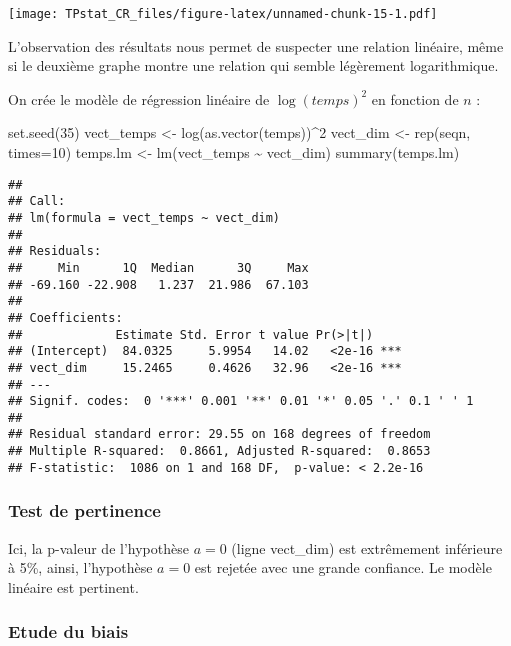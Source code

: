 \documentclass[
]{article}
\newenvironment{Shaded}{\begin{snugshade}}{\end{snugshade}}
\newcommand{\AttributeTok}[1]{\textcolor[rgb]{0.77,0.63,0.00}{#1}}
\newcommand{\DecValTok}[1]{\textcolor[rgb]{0.00,0.00,0.81}{#1}}
\newcommand{\FunctionTok}[1]{\textcolor[rgb]{0.00,0.00,0.00}{#1}}
\newcommand{\NormalTok}[1]{#1}
\newcommand{\OtherTok}[1]{\textcolor[rgb]{0.56,0.35,0.01}{#1}}
\newcommand{\SpecialCharTok}[1]{\textcolor[rgb]{0.00,0.00,0.00}{#1}}
\begin{document}
\texttt{[image: TPstat\_CR\_files/figure-latex/unnamed-chunk-15-1.pdf]}

L'observation des résultats nous permet de suspecter une relation
linéaire, même si le deuxième graphe montre une relation qui semble
légèrement logarithmique.

On crée le modèle de régression linéaire de \(\log(temps)^2\) en
fonction de \(n\) :

\begin{Shaded}
\begin{Highlighting}[]
\FunctionTok{set.seed}\NormalTok{(}\DecValTok{35}\NormalTok{)}
\NormalTok{vect\_temps }\OtherTok{\textless{}{-}} \FunctionTok{log}\NormalTok{(}\FunctionTok{as.vector}\NormalTok{(temps))}\SpecialCharTok{\^{}}\DecValTok{2}
\NormalTok{vect\_dim }\OtherTok{\textless{}{-}} \FunctionTok{rep}\NormalTok{(seqn, }\AttributeTok{times=}\DecValTok{10}\NormalTok{)}
\NormalTok{temps.lm }\OtherTok{\textless{}{-}} \FunctionTok{lm}\NormalTok{(vect\_temps }\SpecialCharTok{\textasciitilde{}}\NormalTok{ vect\_dim)}
\FunctionTok{summary}\NormalTok{(temps.lm)}
\end{Highlighting}
\end{Shaded}

\begin{verbatim}
## 
## Call:
## lm(formula = vect_temps ~ vect_dim)
## 
## Residuals:
##     Min      1Q  Median      3Q     Max 
## -69.160 -22.908   1.237  21.986  67.103 
## 
## Coefficients:
##             Estimate Std. Error t value Pr(>|t|)    
## (Intercept)  84.0325     5.9954   14.02   <2e-16 ***
## vect_dim     15.2465     0.4626   32.96   <2e-16 ***
## ---
## Signif. codes:  0 '***' 0.001 '**' 0.01 '*' 0.05 '.' 0.1 ' ' 1
## 
## Residual standard error: 29.55 on 168 degrees of freedom
## Multiple R-squared:  0.8661, Adjusted R-squared:  0.8653 
## F-statistic:  1086 on 1 and 168 DF,  p-value: < 2.2e-16
\end{verbatim}

\hypertarget{test-de-pertinence}{%
\subsubsection{Test de pertinence}\label{test-de-pertinence}}

Ici, la p-valeur de l'hypothèse \(a=0\) (ligne vect\_dim) est
extrêmement inférieure à 5\%, ainsi, l'hypothèse \(a=0\) est rejetée
avec une grande confiance. Le modèle linéaire est pertinent.

\hypertarget{etude-du-biais}{%
\subsubsection{Etude du biais}\label{etude-du-biais}}
\end{document}
